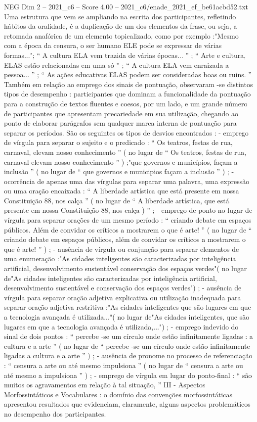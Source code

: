 \begin{textsample}{NEG Dim 2 – 2021\_c6 – Score 4.00 – 2021\_c6/enade\_2021\_ef\_be61acbd52.txt}
Uma estrutura que vem se ampliando na escrita dos participantes, refletindo hábitos da oralidade, é a duplicação de um dos elementos da frase, ou seja, a retomada anafórica de um elemento topicalizado, como por exemplo :"Mesmo com a época da censura, o ser humano ELE pode se expressar de várias formas..."; “ A cultura ELA vem trazida de várias épocas... ” ; “ Arte e cultura, ELAS estão relacionadas em uma só ” ; “ A cultura ELA vem enraizada a pessoa... ” ; “ As ações educativas ELAS podem ser consideradas boas ou ruins. ” Também em relação ao emprego dos sinais de pontuação, observaram -se distintos tipos de desempenho : participantes que dominam a funcionalidade da pontuação para a construção de textos fluentes e coesos, por um lado, e um grande número de participantes que apresentam precariedade em sua utilização, chegando ao ponto de elaborar parágrafos sem qualquer marca interna de pontuação para separar os períodos.
São os seguintes os tipos de desvios encontrados : - emprego de vírgula para separar o sujeito e o predicado : “ Os teatros, festas de rua, carnaval, elevam nosso conhecimento ” ( no lugar de “ Os teatros, festas de rua, carnaval elevam nosso conhecimento ” ) ;"que governos e municípios, façam a inclusão ” ( no lugar de “ que governos e municipios façam a inclusão ” ) ; - ocorrência de apenas uma das vírgulas para separar uma palavra, uma expressão ou uma oração encaixada : “ A liberdade artística que está presente em nossa Constituição 88, nos calça ” ( no lugar de “ A liberdade artística, que está presente em nossa Constituição 88, nos calça ) ” ; - emprego de ponto no lugar de vírgula para separar orações de um mesmo período : “ criando debate em espaços públicos.
Além de convidar os críticos a mostrarem o que é arte! ” ( no lugar de “ criando debate em espaços públicos, além de convidar os críticos a mostrarem o que é arte! ” ) ; - ausência de vírgula ou conjunção para separar elementos de uma enumeração :"As cidades inteligentes são caracterizadas por inteligência artificial, desenvolvimento sustentável conservação dos espaços verdes"( no lugar de"As cidades inteligentes são caracterizadas por inteligência artificial, desenvolvimento sustentável e conservação dos espaços verdes") ; - ausência de vírgula para separar oração adjetiva explicativa ou utilização inadequada para separar oração adjetiva restritiva :"As cidades inteligentes que são lugares em que a tecnologia avançada é utilizada..."( no lugar de"As cidades inteligentes, que são lugares em que a tecnologia avançada é utilizada,...") ; - emprego indevido do sinal de dois pontos : “ percebe -se um círculo onde estão infinitamente ligadas : a cultura e a arte ” ( no lugar de “ percebe -se um círculo onde estão infinitamente ligadas a cultura e a arte ” ) ; - ausência de pronome no processo de referenciação : “ censura a arte ou até mesmo impulsiona ” ( no lugar de “ censura a arte ou até mesmo a impulsiona ” ) ; - emprego de vírgula em lugar do ponto-final : “ são muitos os agravamentos em relação à tal situação, ” III - Aspectos Morfossintáticos e Vocabulares : o domínio das convenções morfossintáticas apresentou resultados que evidenciam, claramente, alguns aspectos problemáticos no desempenho dos participantes.

\end{textsample}
